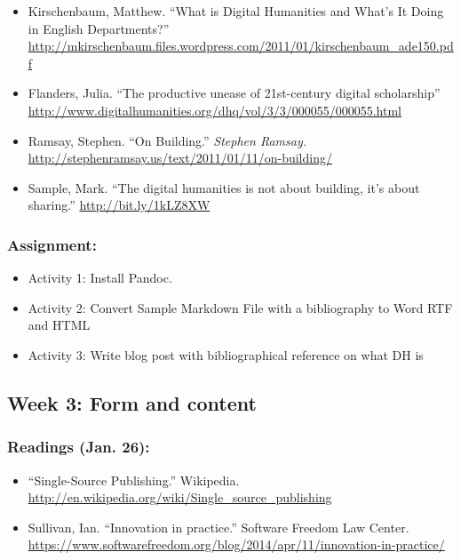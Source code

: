 \documentclass[]{article}
\begin{document}
\begin{itemize}
\itemsep1pt\parskip0pt
\item
  Kirschenbaum, Matthew. ``What is Digital Humanities and What's It
  Doing in English Departments?''
  \url{http://mkirschenbaum.files.wordpress.com/2011/01/kirschenbaum_ade150.pdf}
\item
  Flanders, Julia. ``The productive unease of 21st-century digital
  scholarship''
  \url{http://www.digitalhumanities.org/dhq/vol/3/3/000055/000055.html}
\item
  Ramsay, Stephen. ``On Building.'' \emph{Stephen Ramsay.}
  \url{http://stephenramsay.us/text/2011/01/11/on-building/}
\item
  Sample, Mark. ``The digital humanities is not about building, it's
  about sharing.'' \url{http://bit.ly/1kLZ8XW}
\end{itemize}

\subsubsection{Assignment:}\label{assignment-1}

\begin{itemize}
\itemsep1pt\parskip0pt
\item
  Activity 1: Install Pandoc.
\item
  Activity 2: Convert Sample Markdown File with a bibliography to Word
  RTF and HTML
\item
  Activity 3: Write blog post with bibliographical reference on what DH
  is
\end{itemize}

\subsection{Week 3: Form and content}\label{week-3-form-and-content}

\subsubsection{Readings (Jan. 26):}\label{readings-jan.-26}

\begin{itemize}
\itemsep1pt\parskip0pt
\item
  ``Single-Source Publishing.'' Wikipedia.
  \url{http://en.wikipedia.org/wiki/Single_source_publishing}
\item
  Sullivan, Ian. ``Innovation in practice.'' Software Freedom Law
  Center.
  \url{https://www.softwarefreedom.org/blog/2014/apr/11/innovation-in-practice/}
\end{itemize}
\end{document}
